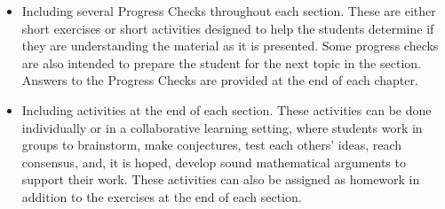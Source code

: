 \begin{enumerate}
\begin{itemize}
\item Including several Progress Checks throughout each section.  These are either short exercises or short activities designed to help the students determine if they are understanding the material as it is presented.  Some progress checks are also intended to prepare the student for the next topic in the section.  Answers to the Progress Checks are provided at the end of each chapter.

\item Including activities at the end of each section.  These activities can be done individually or in a collaborative learning setting, where students work in groups to brainstorm, make conjectures, test each others' ideas, reach consensus, and, it is hoped, develop sound mathematical arguments to support their work.  These activities can also be assigned as homework in addition to the exercises at the end of each section.
\end{itemize}







\end{enumerate}
